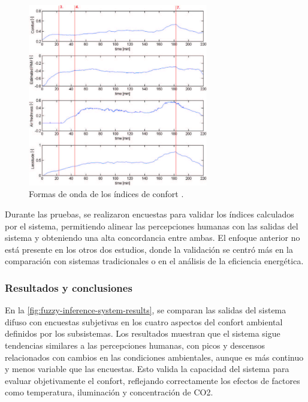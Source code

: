 \begin{figure}[H]
	\centering
	\includegraphics[width=0.7\textwidth]{imgs/fis-output-waveforms.JPG}
	\caption{Formas de onda de los índices de confort \parencite{jablonski2018fuzzy}.}
	\label{fig:fis-output-waveforms}
\end{figure}


Durante las pruebas, se realizaron encuestas para validar los índices calculados por el sistema, permitiendo alinear las percepciones humanas con las salidas del sistema y obteniendo una alta concordancia entre ambas. El enfoque anterior no está presente en los otros dos estudios, donde la validación se centró más en la comparación con sistemas tradicionales o en el análisis de la eficiencia energética.

\subsubsection{Resultados y conclusiones}

En la \autoref{fig:fuzzy-inference-system-results}, se comparan las salidas del sistema difuso con encuestas subjetivas en los cuatro aspectos del confort ambiental definidos por los subsistemas. Los resultados muestran que el sistema sigue tendencias similares a las percepciones humanas, con picos y descensos relacionados con cambios en las condiciones ambientales, aunque es más continuo y menos variable que las encuestas. Esto valida la capacidad del sistema para evaluar objetivamente el confort, reflejando correctamente los efectos de factores como temperatura, iluminación y concentración de CO2.

